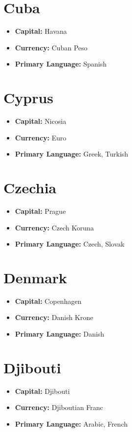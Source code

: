 \documentclass[a4paper,100pt,twoside]{book}
\begin{document}
\section*{\Huge Cuba}
\vspace{5mm} %
\begin{itemize}
	\item \textbf{Capital:} Havana
	\item \textbf{Currency:} Cuban Peso
	\item \textbf{Primary Language:} Spanish
\end{itemize}

\section*{\Huge Cyprus}
\vspace{5mm} %
\begin{itemize}
	\item \textbf{Capital:} Nicosia
	\item \textbf{Currency:} Euro
	\item \textbf{Primary Language:} Greek, Turkish
\end{itemize}

\section*{\Huge Czechia}
\vspace{5mm} %
\begin{itemize}
	\item \textbf{Capital:} Prague
	\item \textbf{Currency:} Czech Koruna
	\item \textbf{Primary Language:} Czech, Slovak
\end{itemize}

\section*{\Huge Denmark}
\vspace{5mm} %
\begin{itemize}
	\item \textbf{Capital:} Copenhagen
	\item \textbf{Currency:} Danish Krone
	\item \textbf{Primary Language:} Danish
\end{itemize}

\section*{\Huge Djibouti}
\vspace{5mm} %
\begin{itemize}
	\item \textbf{Capital:} Djibouti
	\item \textbf{Currency:} Djiboutian Franc
	\item \textbf{Primary Language:} Arabic, French
\end{itemize}
\end{document}
